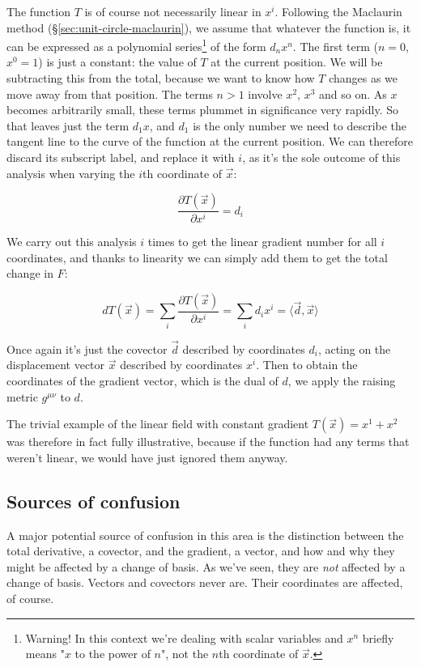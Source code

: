 The function $T$ is of course not necessarily linear in $x^i$. Following the Maclaurin method (§\ref{sec:unit-circle-maclaurin}), we assume that whatever the function is, it can be expressed as a polynomial series\footnote{Warning! In this context we're dealing with scalar variables and $x^n$ briefly means "$x$ to the power of $n$", not the $n$th coordinate of $\vec{x}$.} of the form $d_n x^n$. The first term ($n = 0$, $x^0 = 1$) is just a constant: the value of $T$ at the current position. We will be subtracting this from the total, because we want to know how $T$ changes as we move away from that position. The terms $n > 1$ involve $x^2$, $x^3$ and so on. As $x$ becomes arbitrarily small, these terms plummet in significance very rapidly. So that leaves just the term $d_1 x$, and $d_1$ is the only number we need to describe the tangent line to the curve of the function at the current position. We can therefore discard its subscript label, and replace it with $i$, as it's the sole outcome of this analysis when varying the $i$th coordinate of $\vec{x}$:

$$
\frac{\partial T(\vec{x})}{\partial x^i} = d_i
$$

We carry out this analysis $i$ times to get the linear gradient number for all $i$ coordinates, and thanks to linearity we can simply add them to get the total change in $F$:

$$
d T(\vec{x}) = \sum_i \frac{\partial T(\vec{x})}{\partial x^i}
= \sum_i d_i x^i
= \langle \vec{d} , \vec{x} \rangle
$$

Once again it's just the covector $\vec{d}$ described by coordinates $d_i$, acting on the displacement vector $\vec{x}$ described by coordinates $x^i$. Then to obtain the coordinates of the gradient vector, which is the dual of $d$, we apply the raising metric $g^{\mu\nu}$ to $d$.

The trivial example of the linear field with constant gradient $T(\vec{x}) = x^1 + x^2$ was therefore in fact fully illustrative, because if the function had any terms that weren't linear, we would have just ignored them anyway.

\subsection{Sources of confusion}

A major potential source of confusion in this area is the distinction between the total derivative, a covector, and the gradient, a vector, and how and why they might be affected by a change of basis. As we've seen, they are \textit{not} affected by a change of basis. Vectors and covectors never are. Their coordinates are affected, of course.

